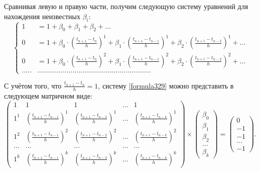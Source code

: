 Сравнивая левую и правую части, получим следующую систему уравнений для нахождения неизвестных $\beta_i$:
\begin{equation}
\label{formula329}
\left\{
\begin{aligned}
1 & = 1+\beta_0+\beta_1+\beta_2+\dots  \\
0 & = 1 + \beta_0 \cdot \left(\frac{t_{n+1}-t_n}{h}\right)^1 +\beta_1 \cdot \left(\frac{t_{n+1}-t_{n-1}}{h}\right)^1 +\beta_2 \cdot \left(\frac{t_{n+1}-t_{n-2}}{h}\right)^1 +\dots \\
0 & = 1 + \beta_0 \cdot \left(\frac{t_{n+1}-t_n}{h}\right)^2 +\beta_1 \cdot \left(\frac{t_{n+1}-t_{n-1}}{h}\right)^2 +\beta_2 \cdot \left(\frac{t_{n+1}-t_{n-2}}{h}\right)^2 +\dots \\
..... & .......................................................... 
\end{aligned}
\right.
\end{equation}

С учётом того, что $\frac{t_{n+1}-t_n}{h}=1$, систему \eqref{formula329} можно представить в следующем матричном виде:
\begin{equation}
\label{formula330}
\begin{pmatrix}
1 & 1 & 1 & \dots & 1 \\
1^1 & \left(\frac{t_{n+1}-t_{n-1}}{h} \right)^1 & \left(\frac{t_{n+1}-t_{n-2}}{h} \right)^1 & \dots & \left(\frac{t_{n+1}-t_{n-k}}{h} \right)^1 \\
1^2 & \left(\frac{t_{n+1}-t_{n-1}}{h} \right)^2 & \left(\frac{t_{n+1}-t_{n-2}}{h} \right)^2 & \dots & \left(\frac{t_{n+1}-t_{n-k}}{h} \right)^2 \\
\dots & \dots & \dots & \dots & \dots \\
1^k & \left(\frac{t_{n+1}-t_{n-1}}{h} \right)^k & \left(\frac{t_{n+1}-t_{n-2}}{h} \right)^k & \dots & \left(\frac{t_{n+1}-t_{n-k}}{h} \right)^k
\end{pmatrix} \times 
\begin{pmatrix}
\beta_0 \\
\beta_1 \\
\beta_2 \\
\dots \\
\beta_k
\end{pmatrix} =
\begin{pmatrix}
0 \\
-1 \\
-1 \\
\dots \\
-1
\end{pmatrix}.
\end{equation}


